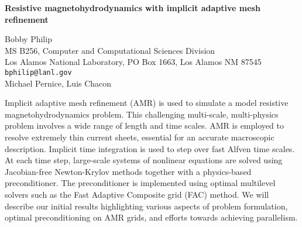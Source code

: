 \documentclass{report}
\begin{document}

\begin{center}
{\large
{\bf Resistive magnetohydrodynamics with implicit adaptive mesh refinement}}

	Bobby Philip \\
	MS B256, Computer and Computational Sciences Division \\
	Los Alamos National Laboratory, PO Box 1663, Los Alamos NM 87545 \\
	{\tt bphilip@lanl.gov} \\
	Michael Pernice, Luis Chacon
\end{center}
Implicit adaptive mesh refinement (AMR) is used to simulate
a model resistive magnetohydrodynamics problem. This
challenging multi-scale, multi-physics problem involves a
wide range of length and time scales. AMR is employed to
resolve extremely thin current sheets, essential for an
accurate macroscopic description. Implicit time integration
is used to step over fast Alfven time scales. At each time
step, large-scale systems of nonlinear equations are solved
using Jacobian-free Newton-Krylov methods together with a
physics-based preconditioner. The preconditioner is
implemented using optimal multilevel solvers such as the
Fast Adaptive Composite grid (FAC) method. We will describe
our initial results highlighting various aspects of problem
formulation, optimal preconditioning on AMR grids, and
efforts towards achieving parallelism.



\end{document}
